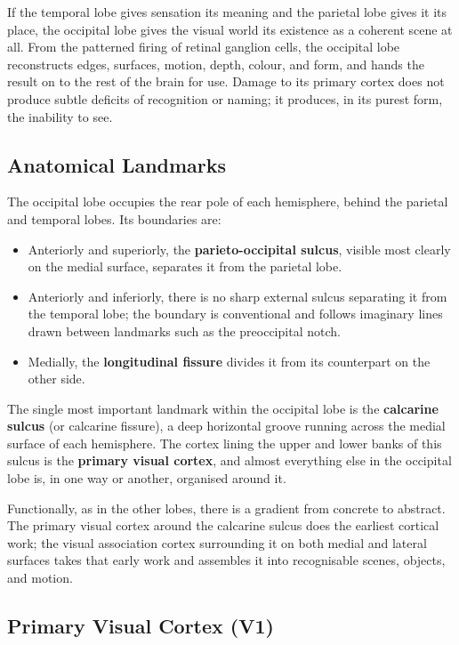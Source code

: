 \documentclass[11pt]{article}
\begin{document}
If the temporal lobe gives sensation its meaning and the parietal lobe gives it its place, the occipital lobe gives the visual world its existence as a coherent scene at all. From the patterned firing of retinal ganglion cells, the occipital lobe reconstructs edges, surfaces, motion, depth, colour, and form, and hands the result on to the rest of the brain for use. Damage to its primary cortex does not produce subtle deficits of recognition or naming; it produces, in its purest form, the inability to see.

\subsection{Anatomical Landmarks}

The occipital lobe occupies the rear pole of each hemisphere, behind the parietal and temporal lobes. Its boundaries are:

\begin{itemize}
    \item Anteriorly and superiorly, the \textbf{parieto-occipital sulcus}, visible most clearly on the medial surface, separates it from the parietal lobe.
    \item Anteriorly and inferiorly, there is no sharp external sulcus separating it from the temporal lobe; the boundary is conventional and follows imaginary lines drawn between landmarks such as the preoccipital notch.
    \item Medially, the \textbf{longitudinal fissure} divides it from its counterpart on the other side.
\end{itemize}

The single most important landmark within the occipital lobe is the \textbf{calcarine sulcus} (or calcarine fissure), a deep horizontal groove running across the medial surface of each hemisphere. The cortex lining the upper and lower banks of this sulcus is the \textbf{primary visual cortex}, and almost everything else in the occipital lobe is, in one way or another, organised around it.

Functionally, as in the other lobes, there is a gradient from concrete to abstract. The primary visual cortex around the calcarine sulcus does the earliest cortical work; the visual association cortex surrounding it on both medial and lateral surfaces takes that early work and assembles it into recognisable scenes, objects, and motion.

\subsection{Primary Visual Cortex (V1)}
\end{document}
